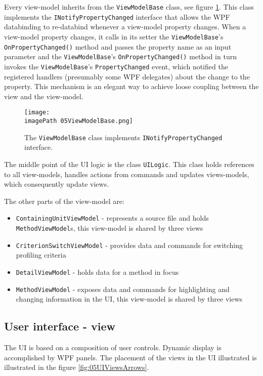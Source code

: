 Every view-model inherits from the \texttt{ViewModelBase} class, see figure \ref{fig:05ViewModelBase}. This class implements the \texttt{INotifyPropertyChanged} interface that allows the WPF databinding to re-databind whenever a view-model property changes. When a view-model property changes, it calls in its setter the \texttt{ViewModelBase}'s \texttt{OnPropertyChanged()} method and passes the property name as an input parameter and the \texttt{ViewModelBase}'s \texttt{OnPropertyChanged()} method in turn invokes the \texttt{ViewModelBase}'s \texttt{PropertyChanged} event, which notified the registered handlers (presumably some WPF delegates) about the change to the property. This mechanism is an elegant way to achieve loose coupling between the view and the view-model.
 
 \begin{figure}
	\centering
		\texttt{[image: \\imagePath 05ViewModelBase.png]}
		\caption{The \texttt{ViewModelBase} class implements \texttt{INotifyPropertyChanged} interface.}
	\label{fig:05ViewModelBase}
\end{figure}

The middle point of the UI logic is the class \texttt{UILogic}. This class holds references to all view-models, handles actions from commands and updates views-models, which consequently update views.

The other parts of the view-model are:
\begin{itemize}	
\item  \texttt{ContainingUnitViewModel} - represents a source file and holds \texttt{MethodViewModel}s, this view-model is shared by three views	

\item \texttt{CriterionSwitchViewModel} - provides data and commands for switching profiling criteria

\item \texttt{DetailViewModel} - holds data for a method in focus

\item \texttt{MethodViewModel} - exposes data and commands for highlighting and changing information in the UI, this view-model is shared by three views	
\end{itemize}


\subsection{User interface - view}
The UI is based on a composition of user controls. Dynamic display is accomplished by WPF panels. The placement of the views in the UI illustrated is illustrated in the figure \ref{fig:05UIViewsArrows}. 


